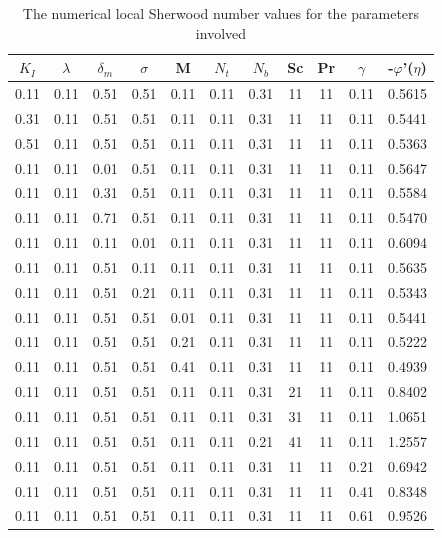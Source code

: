 \begin{table}
	\centering
	\renewcommand{\arraystretch}{1.5}
	\begin{tabular}{|c|c|c|c|c|c|c|c|c|c|c|}
		\hline
		$ K_I$ & $\lambda$ & $\delta_m$ & $\sigma$ & M & $N_t$ & $N_b$ & Sc & Pr & $\gamma$ & -$\varphi$'($\eta$) \\ \hline
		0.11 & 0.11 & 0.51 & 0.51 & 0.11 & 0.11 & 0.31 & 11 & 11 & 0.11 & 0.5615 \\
		0.31 & 0.11 & 0.51 & 0.51 & 0.11 & 0.11 & 0.31 & 11 & 11 & 0.11 & 0.5441 \\
		0.51 & 0.11 & 0.51 & 0.51 & 0.11 & 0.11 & 0.31 & 11 & 11 & 0.11 & 0.5363 \\
		0.11 & 0.11 & 0.01 & 0.51 & 0.11 & 0.11 & 0.31 & 11 & 11 & 0.11 & 0.5647 \\
		0.11 & 0.11 & 0.31 & 0.51 & 0.11 & 0.11 & 0.31 & 11 & 11 & 0.11 & 0.5584 \\
		0.11 & 0.11 & 0.71 & 0.51 & 0.11 & 0.11 & 0.31 & 11 & 11 & 0.11 & 0.5470 \\
		0.11 & 0.11 & 0.11 & 0.01 & 0.11 & 0.11 & 0.31 & 11 & 11 & 0.11 & 0.6094 \\
		0.11 & 0.11 & 0.51 & 0.11 & 0.11 & 0.11 & 0.31 & 11 & 11 & 0.11 & 0.5635 \\
		0.11 & 0.11 & 0.51 & 0.21 & 0.11 & 0.11 & 0.31 & 11 & 11 & 0.11 & 0.5343 \\
		0.11 & 0.11 & 0.51 & 0.51 & 0.01 & 0.11 & 0.31 & 11 & 11 & 0.11 & 0.5441 \\
		0.11 & 0.11 & 0.51 & 0.51 & 0.21 & 0.11 & 0.31 & 11 & 11 & 0.11 & 0.5222 \\
		0.11 & 0.11 & 0.51 & 0.51 & 0.41 & 0.11 & 0.31 & 11 & 11 & 0.11 & 0.4939 \\
		0.11 & 0.11 & 0.51 & 0.51 & 0.11 & 0.11 & 0.31 & 21 & 11 & 0.11 & 0.8402 \\
		0.11 & 0.11 & 0.51 & 0.51 & 0.11 & 0.11 & 0.31 & 31 & 11 & 0.11 & 1.0651 \\
		0.11 & 0.11 & 0.51 & 0.51 & 0.11 & 0.11 & 0.21 & 41 & 11 & 0.11 & 1.2557 \\
		0.11 & 0.11 & 0.51 & 0.51 & 0.11 & 0.11 & 0.31 & 11 & 11 & 0.21 & 0.6942 \\
		0.11 & 0.11 & 0.51 & 0.51 & 0.11 & 0.11 & 0.31 & 11 & 11 & 0.41 & 0.8348 \\
		0.11 & 0.11 & 0.51 & 0.51 & 0.11 & 0.11 & 0.31 & 11 & 11 & 0.61 & 0.9526 \\
		\hline
	\end{tabular}\\
	\caption{The numerical local Sherwood number values for the parameters involved}
	\label{table:2}
\end{table}








